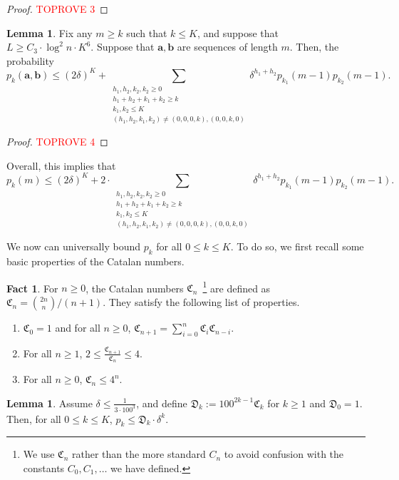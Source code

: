 \documentclass[12pt]{article}
\theoremstyle{definition}
\newtheorem{fact}[theorem]{Fact}
\newtheorem{lemma}[theorem]{Lemma}
\theoremstyle{remark}
\newcommand{\ten}{100}
\newcommand{\fC}{\mathfrak{C}}
\newcommand{\fD}{\mathfrak{D}}
\newcommand{\ba}{\mathbf a}
\newcommand{\bb}{\mathbf b}
\begin{document}
\begin{proof}\textcolor{red}{TOPROVE 3}\end{proof}

\begin{lemma} \label{lem:no-periodic-bound}
    Fix any $m \ge k$ such that $k \le K$, and suppose that $L \ge C_3 \cdot \log^2 n \cdot K^6$. Suppose that $\ba, \bb$ are sequences of length $m$.
    Then, the probability
\[p_k(\ba, \bb) \le (2\delta)^{K} + \sum_{\substack{h_1, h_2, k_2, k_2 \ge 0 \\ h_1+h_2+k_1+k_2 \ge k \\ k_1, k_2 \le K \\ (h_1, h_2, k_1, k_2) \neq (0, 0, 0, k), (0, 0, k, 0)}} \delta^{h_1+h_2} p_{k_1}(m-1) p_{k_2}(m-1).\]
\end{lemma}

\begin{proof}\textcolor{red}{TOPROVE 4}\end{proof}

Overall, this implies that 
\[p_k(m) \le (2\delta)^{K} + 2 \cdot \sum_{\substack{h_1, h_2, k_2, k_2 \ge 0 \\ h_1+h_2+k_1+k_2 \ge k \\ k_1, k_2 \le K \\ (h_1, h_2, k_1, k_2) \neq (0, 0, 0, k), (0, 0, k, 0)}} \delta^{h_1+h_2} p_{k_1}(m-1) p_{k_2}(m-1).\]

We now can universally bound $p_k$ for all $0 \le k \le K$. To do so, we first recall some basic properties of the Catalan numbers.

\begin{fact} \label{fact:catalan}
    For $n \ge 0$, the Catalan numbers $\fC_n$~\footnote{We use $\fC_n$ rather than the more standard $C_n$ to avoid confusion with the constants $C_0, C_1, \dots$ we have defined.} are defined as $\fC_n = {2n \choose n}/(n+1)$. They satisfy the following list of properties.
\begin{enumerate}
    \item $\fC_0 = 1$ and for all $n \ge 0$, $\fC_{n+1} = \sum_{i=0}^n \fC_i \fC_{n-i}$.
    \item For all $n \ge 1$, $2 \le \frac{\fC_{n+1}}{\fC_n} \le 4$.
    \item For all $n \ge 0$, $\fC_n \le 4^n$.
\end{enumerate}
\end{fact}

\begin{lemma} \label{lem:computation}
    Assume $\delta \le \frac{1}{3 \cdot \ten^3}$, and define $\fD_k := 100^{2k-1} \fC_k$ for $k \ge 1$ and $\fD_0 = 1$. Then, for all $0 \le k \le K$, $p_k \le \fD_k \cdot \delta^k$.
\end{lemma}
\end{document}
